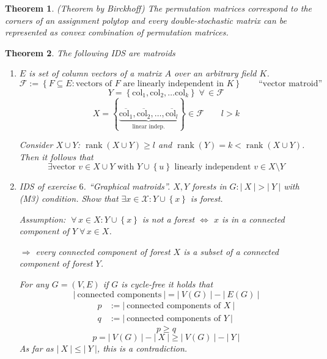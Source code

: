 \documentclass{article}
\newtheorem{theorem}{Theorem}
\newcommand{\card}[1]{\left|\:\!#1\:\!\right|}
\newcommand{\set}[1]{\left\{#1\right\}}
\newcommand{\fall}{\;\forall\,}
\DeclareMathOperator{\rank}{rank}
\begin{document}
\begin{theorem}
  (Theorem by Birckhoff)
  The permutation matrices correspond to the corners of an assignment polytop and every double-stochastic matrix can be represented as convex combination of permutation matrices.
\end{theorem}
\begin{theorem}
  \label{proposition-8.1}
  The following IDS are matroids
  \begin{enumerate}
    \item $E$ is set of column vectors of a matrix $A$ over an arbitrary field $K$.
      \[
        \mathcal{F} := \set{F \subseteq E: \text{vectors of } F \text{ are linearly independent in } K}
            \qquad \text{``vector matroid''}
      \] \[
        Y = \set{\text{col}_1, \text{col}_2, \ldots \text{col}_k} \fall \in \mathcal{F}
      \] \[
        X = \set{
          \underbrace{\overline{\text{col}_1}, \overline{\text{col}_2}, \ldots, \overline{\text{col}_l}}_{\text{linear indep.}}
        } \in \mathcal{F} \qquad l > k
      \]

      Consider $X \cup Y$: $\rank(X \cup Y) \geq l$ and $\rank(Y) = k < \rank(X \cup Y)$.
      Then it follows that
      \[
        \exists \text{vector } v \in X \cup Y \text{ with } Y \cup \set{u}
        \text{ linearly independent } v \in X \setminus Y
      \]

    \item IDS of exercise $6$. ``\emph{Graphical matroids}''. 
      $X, Y$ forests in $G: \card{X} > \card{Y}$ with (M3) condition. Show that $\exists x \in \mathcal{X}: Y \cup \set{x}$ is forest.

      Assumption: $\fall x \in X: Y \cup \set{x}$ is not a forest $\Leftrightarrow$ $x$ is in a connected component of $Y \fall x \in X$.

      $\Rightarrow$ every connected component of forest $X$ is a subset of a connected component of forest $Y$.


      For any $G = (V, E)$ if $G$ is cycle-free it holds that
      \[ \card{\text{connected components}} = \card{V(G)} - \card{E(G)}  \]
      \begin{align*}
        p &:= \card{\text{connected components of } X} \\
        q &:= \card{\text{connected components of } Y}
      \end{align*}
      \[
        p \geq q
      \] \[
        p = \card{V(G)} - \card{X} \geq \card{V(G)} - \card{Y}
      \]
      As far as $\card{X} \leq \card{Y}$, this is a contradiction.


\end{enumerate}
\end{theorem}
\end{document}
